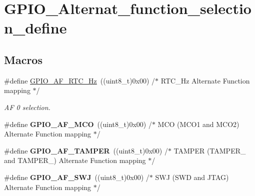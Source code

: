 \hypertarget{group___g_p_i_o___alternat__function__selection__define}{\section{G\-P\-I\-O\-\_\-\-Alternat\-\_\-function\-\_\-selection\-\_\-define}
\label{group___g_p_i_o___alternat__function__selection__define}
}
\subsection*{Macros}
\begin{DoxyCompactItemize}
\item 
\hypertarget{group___g_p_i_o___alternat__function__selection__define_ga93071f0121fab9f8f13e59c612ed6291}{\#define \hyperlink{group___g_p_i_o___alternat__function__selection__define_ga93071f0121fab9f8f13e59c612ed6291}{G\-P\-I\-O\-\_\-\-A\-F\-\_\-\-R\-T\-C\-\_\-Hz}~((uint8\-\_\-t)0x00)  /$\ast$ R\-T\-C\-\_\-Hz Alternate Function mapping $\ast$/}\label{group___g_p_i_o___alternat__function__selection__define_ga93071f0121fab9f8f13e59c612ed6291}

\begin{DoxyCompactList}\small\item\em A\-F 0 selection. \end{DoxyCompactList}\item 
\hypertarget{group___g_p_i_o___alternat__function__selection__define_gacfe2ce01055b82d0fcdd93da513f7cc0}{\#define {\bfseries G\-P\-I\-O\-\_\-\-A\-F\-\_\-\-M\-C\-O}~((uint8\-\_\-t)0x00)  /$\ast$ M\-C\-O (\-M\-C\-O1 and M\-C\-O2) Alternate Function mapping $\ast$/}\label{group___g_p_i_o___alternat__function__selection__define_gacfe2ce01055b82d0fcdd93da513f7cc0}

\item 
\hypertarget{group___g_p_i_o___alternat__function__selection__define_gac284edf4c3267d864b3d56cc6bf6ac95}{\#define {\bfseries G\-P\-I\-O\-\_\-\-A\-F\-\_\-\-T\-A\-M\-P\-E\-R}~((uint8\-\_\-t)0x00)  /$\ast$ T\-A\-M\-P\-E\-R (\-T\-A\-M\-P\-E\-R\-\_ and T\-A\-M\-P\-E\-R\-\_) Alternate Function mapping $\ast$/}\label{group___g_p_i_o___alternat__function__selection__define_gac284edf4c3267d864b3d56cc6bf6ac95}

\item 
\hypertarget{group___g_p_i_o___alternat__function__selection__define_ga63cfa7c46dc0c5ab9cdf7340cc95f7fc}{\#define {\bfseries G\-P\-I\-O\-\_\-\-A\-F\-\_\-\-S\-W\-J}~((uint8\-\_\-t)0x00)  /$\ast$ S\-W\-J (\-S\-W\-D and J\-T\-A\-G) Alternate Function mapping $\ast$/}\label{group___g_p_i_o___alternat__function__selection__define_ga63cfa7c46dc0c5ab9cdf7340cc95f7fc}


\end{DoxyCompactItemize}
